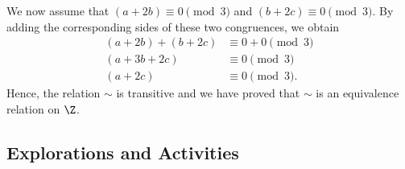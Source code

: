 \begin{enumerate}
\begin{enumerate}
\begin{myproof}
We now assume that $\left( a + 2b \right) \equiv 0\pmod 3$ and 
$\left( b + 2c \right) \equiv 0\pmod 3$.  By adding the corresponding sides of these two congruences, we obtain
\begin{align*}
\left( a + 2b \right) + \left( b + 2c \right) &\equiv 0 + 0 \pmod 3 \\
\left( a + 3b + 2c \right) &\equiv 0 \pmod 3 \\
\left( a + 2c \right) &\equiv 0 \pmod 3.
\end{align*}
Hence, the relation $\sim$ is transitive and we have proved that $\sim$ is an equivalence relation on $\Z$.
\end{myproof}
\end{enumerate}
\end{enumerate}


\subsection*{Explorations and Activities}
\setcounter{oldenumi}{\theenumi}
